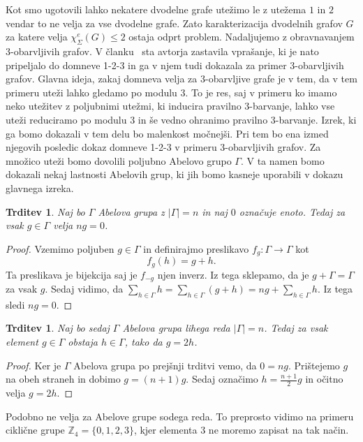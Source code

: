 \documentclass[12pt,a4paper,twoside]{article}
\theoremstyle{definition} %
\theoremstyle{plain} %
\newtheorem{trditev}[definicija]{Trditev}
\newcommand{\ec}{\chi_{\Sigma}^e}
\numberwithin{equation}{section}  %
\begin{document}
 Kot smo ugotovili lahko nekatere dvodelne grafe utežimo le z utežema $1$ in $2$ vendar to ne velja za vse dvodelne grafe. Zato karakterizacija dvodelnih grafov $G$ za katere velja $\ec(G) \le 2$ ostaja odprt problem. Nadaljujemo z obravnavanjem $3$-obarvljivih grafov. 
  V članku~\citet{base}  sta  avtorja zastavila vprašanje, ki je nato pripeljalo do domneve 1-2-3 in ga v njem tudi dokazala za primer $3$-obarvljivih grafov. Glavna ideja, zakaj domneva velja za 3-obarvljive grafe je v tem, da v tem primeru uteži lahko gledamo po modulu 3. To je res, saj v primeru ko imamo neko utežitev z poljubnimi utežmi, ki inducira pravilno 3-barvanje, lahko vse uteži reduciramo po modulu 3 in še vedno ohranimo pravilno 3-barvanje. Izrek, ki ga bomo dokazali v tem delu bo malenkost močnejši. Pri tem bo ena izmed njegovih posledic dokaz domneve 1-2-3 v primeru 3-obarvljivih grafov. Za množico uteži bomo dovolili poljubno Abelovo grupo $\Gamma$. V ta namen bomo dokazali nekaj lastnosti Abelovih grup, ki jih bomo kasneje uporabili v dokazu glavnega izreka.
  \begin{trditev}
  	Naj bo $\Gamma$ Abelova grupa z $|\Gamma| = n$ in naj $0$ označuje enoto. Tedaj za vsak $g \in \Gamma$ velja $n g = 0$.
  \end{trditev}

\begin{proof}
	Vzemimo poljuben $g \in \Gamma$ in definirajmo preslikavo $f_g : \Gamma \rightarrow \Gamma$ kot
	$$f_g(h) = g + h .$$
	Ta preslikava je bijekcija saj je $f_{-g}$ njen inverz. Iz tega sklepamo, da je $ g + \Gamma = \Gamma$ za vsak $g$. Sedaj vidimo, da $ \sum_{h \in \Gamma} h = \sum_{h \in \Gamma} (g + h) = ng + \sum_{h \in \Gamma} h$. Iz tega sledi $ng = 0$.
\end{proof}


\begin{trditev}
	Naj bo sedaj $\Gamma$ Abelova grupa lihega reda $|\Gamma| = n$. Tedaj za vsak element $g \in \Gamma$ obstaja $h \in \Gamma$, tako da $g = 2h$.
\end{trditev}

\begin{proof}
	Ker je $\Gamma$ Abelova grupa po prejšnji trditvi vemo, da $ 0 = ng$. Prištejemo $g$ na obeh straneh in dobimo $g = (n+1)g$. Sedaj označimo $h = \frac{n + 1}{2}g$ in očitno velja $g = 2h$.
\end{proof}

Podobno ne velja za Abelove grupe sodega reda. To preprosto vidimo na primeru ciklične grupe $\mathbb{Z}_4 = \{0,1,2,3\}$, kjer elementa $3$ ne moremo zapisat na tak način.
\end{document}
